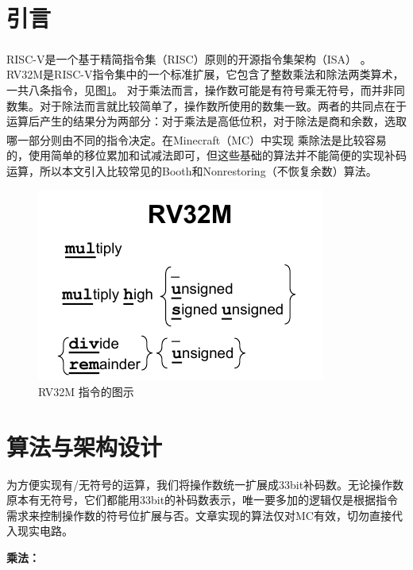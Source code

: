 \documentclass[UTF8,12pt,punct=kaiming,fontset=none]{ctexart}
\newcommand*{\upcite}[1]{
    \textsuperscript{\cite{#1}}
}
\begin{document}

\section{引言}
RISC-V是一个基于精简指令集（RISC）原则的开源指令集架构（ISA）\upcite{patterson2017risc}。
RV32M是RISC-V指令集中的一个标准扩展，它包含了整数乘法和除法两类算术，一共八条指令，见图\ref{fig1}。
对于乘法而言，操作数可能是有符号乘无符号，而并非同数集。对于除法而言就比较简单了，操作数所使用的数集一致。两者的共同点在于运算后产生的结果分为两部分：对于乘法是高低位积，对于除法是商和余数，选取哪一部分则由不同的指令决定。在Minecraft（MC）中实现\upcite{RLC}乘除法是比较容易的，使用简单的移位累加和试减法即可，但这些基础的算法并不能简便的实现补码运算，所以本文引入比较常见的Booth和Nonrestoring（不恢复余数）算法。

\begin{figure}[H]
    \centering
    \includegraphics[scale=1]{RV32M.pdf}
    \caption{RV32M 指令的图示}
    \label{fig1}
\end{figure}

\section{算法与架构设计}
为方便实现有/无符号的运算，我们将操作数统一扩展成33bit补码数。无论操作数原本有无符号，它们都能用33bit的补码数表示，唯一要多加的逻辑仅是根据指令需求来控制操作数的符号位扩展与否。文章实现的算法仅对MC有效，切勿直接代入现实电路。
\newline

\textbf{乘法：}
\end{document}
